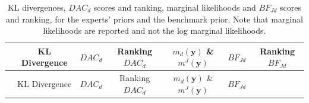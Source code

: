 \documentclass[openright,titlepage,12pt,a4paper]{book}
\begin{document}
\begin{longtable}[]{@{}lcccccc@{}}
\caption{\label{tab:ch03tab2} KL divergences, \(DAC_d\) scores and ranking, marginal likelihoods and \(BF_{Jd}\) scores and ranking, for the experts' priors and the benchmark prior. Note that marginal likelihoods are reported and not the log marginal likelihoods.}\tabularnewline
\toprule
\begin{minipage}[b]{0.11\columnwidth}\raggedright
\strut
\end{minipage} & \begin{minipage}[b]{0.12\columnwidth}\centering
KL Divergence\strut
\end{minipage} & \begin{minipage}[b]{0.08\columnwidth}\centering
\(DAC_d\)\strut
\end{minipage} & \begin{minipage}[b]{0.14\columnwidth}\centering
Ranking \(DAC_d\)\strut
\end{minipage} & \begin{minipage}[b]{0.16\columnwidth}\centering
\(m_d(\textbf{y})\) \&
\(m^J(\textbf{y})\)\strut
\end{minipage} & \begin{minipage}[b]{0.09\columnwidth}\centering
\(BF_{Jd}\)\strut
\end{minipage} & \begin{minipage}[b]{0.10\columnwidth}\centering
Ranking
\(BF_{Jd}\)\strut
\end{minipage}\tabularnewline
\midrule
\endfirsthead
\toprule
\begin{minipage}[b]{0.11\columnwidth}\raggedright
\strut
\end{minipage} & \begin{minipage}[b]{0.12\columnwidth}\centering
KL Divergence\strut
\end{minipage} & \begin{minipage}[b]{0.08\columnwidth}\centering
\(DAC_d\)\strut
\end{minipage} & \begin{minipage}[b]{0.14\columnwidth}\centering
Ranking \(DAC_d\)\strut
\end{minipage} & \begin{minipage}[b]{0.16\columnwidth}\centering
\(m_d(\textbf{y})\) \&
\(m^J(\textbf{y})\)\strut
\end{minipage} & \begin{minipage}[b]{0.09\columnwidth}\centering
\(BF_{Jd}\)\strut
\end{minipage} & \begin{minipage}[b]{0.10\columnwidth}\centering

\end{minipage}
\end{longtable}
\end{document}
